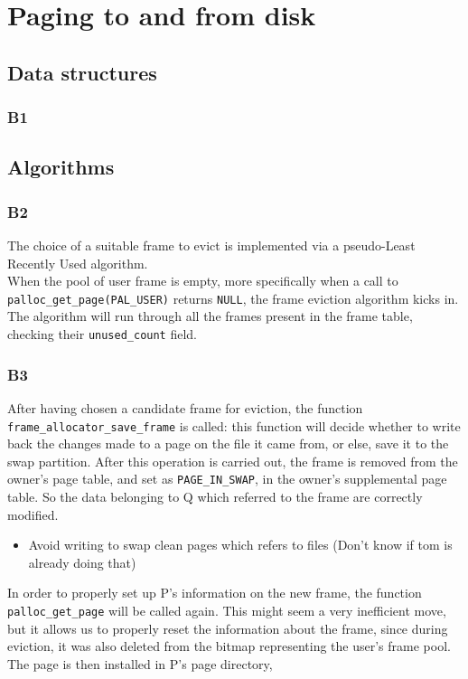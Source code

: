 \documentclass[a4wide, 11pt]{article}
\newcommand{\tx}{\texttt}
\begin{document}
\section{Paging to and from disk}

\subsection{Data structures}
\subsubsection{B1}

\subsection{Algorithms}
\subsubsection{B2}
The choice of a suitable frame to evict is implemented via a pseudo-Least Recently Used algorithm.\\
 When the pool of user frame is empty, more specifically when a call to \tx{palloc\_get\_page(PAL\_USER)} returns \tx{NULL}, the frame eviction algorithm kicks in. \\The algorithm will run through all the frames present in the frame table, checking their \tx{unused\_count} field. 
 
 

\subsubsection{B3}
After having chosen a candidate frame for eviction, the function \tx{frame\_allocator\_save\_frame} is called: this function will decide whether to write back the changes made to a page on the file it came from, or else, save it to the swap partition. After this operation is carried out, the frame is removed from the owner's page table, and set as \tx{PAGE\_IN\_SWAP}, in the owner's supplemental page table. So the data belonging to Q which referred to the frame are correctly modified.
\begin{itemize}
\item Avoid writing to swap clean pages which refers to files (Don't know if tom is already doing that)
\end{itemize}  
In order to properly set up P's information on the new frame, the function \tx{palloc\_get\_page} will be called again. This might seem a very inefficient move, but it allows us to properly reset the information about the frame, since during eviction, it was also deleted from the bitmap representing the user's frame pool.\\
The page is then installed in P's page directory,   
\end{document}
